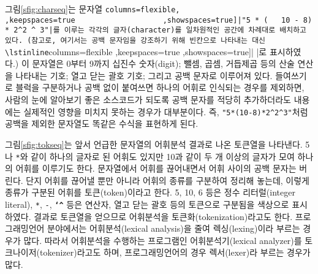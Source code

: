 그림\;\ref{sfig:charseq}는 문자열
\lstinline[columns=flexible,
                   ,keepspaces=true
                   ,showspaces=true]|"5 * (   10 - 8) * 2^2 ^ 3"|를
이루는 각각의 글자(character)를 일차원적인 공간에 차례대로 배치하고 있다.
(참고로, 여기서는 공백 문자임을 강조하기 위해 빈칸으로 나타내는 대신
\lstinline[columns=flexible
                   ,keepspaces=true
                   ,showspaces=true]| |로 표시하였다.)
이 문자열은 0부터 9까지 십진수 숫자(digit); 뺄셈, 곱셈, 거듭제곱 등의
산술 연산을 나타내는 기호; 열고 닫는 괄호 기호; 그리고 공백 문자로
이루어져 있다. 들여쓰기로 블럭을 구분하거나 공백 없이 붙여쓰면 하나의
어휘로 인식되는 경우를 제외하면, 사람의 눈에 알아보기 좋은 소스코드가
되도록 공백 문자를 적당히 추가하더라도 내용에는 실제적인 영향을
미치지 못하는 경우가 대부분이다. 즉,
\lstinline[columns=flexible
                   ,keepspaces=true
                   ,showspaces=true]|"5*(10-8)*2^2^3"|처럼
공백을 제외한 문자열도 똑같은 수식을 표현하게 된다.

그림\;\ref{sfig:tokseq}는 앞서 언급한 문자열의 어휘분석 결과로 나온
토큰열을 나타낸다. 5나 \texttt{*}와 같이 하나의 글자로 된 어휘도 있지만
10과 같이 두 개 이상의 글자가 모여 하나의 어휘를 이루기도 한다.
문자열에서 어휘를 끊어내면서 어휘 사이의 공백 문자는 버린다.
단지 어휘를 끊어낼 뿐만 아니라 어휘의 종류를 구분하여 정리해 놓는데,
이렇게 종류가 구분된 어휘를 토큰(token)이라고 한다.
5, 10, 6 등은 정수 리터럴(integer literal),
\texttt{*}, \texttt{-}, \texttt{\textbf{\char`^}} 등은 연산자,
열고 닫는 괄호 등의 토큰으로 구분됨을 색상으로 표시하였다.
결과로 토큰열을 얻으므로 어휘분석을
%
%
토큰화(tokenization)라고도 한다.
프로그래밍언어 분야에서는
%
%
어휘분석(lexical analysis)을 줄여
렉싱(lexing)이라 부르는 경우가 많다. 따라서 어휘분석을 수행하는
프로그램인 어휘분석기(lexical analyzer)를 토크나이저(tokenizer)라고도 하며,
프로그래밍언어의 경우
%
%
렉서(lexer)라 부르는 경우가 많다.

